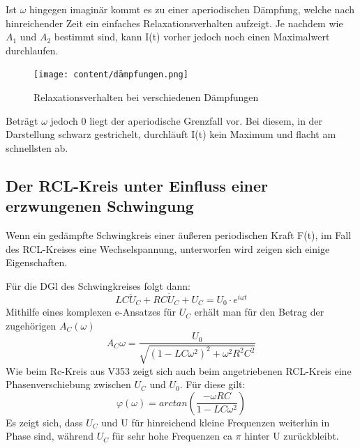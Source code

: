Ist $\omega$ hingegen imaginär kommt es zu einer
aperiodischen Dämpfung, welche nach hinreichender Zeit  ein einfaches Relaxationsverhalten
 aufzeigt. Je nachdem wie $A_1$ und $A_2$ bestimmt sind, kann I(t) vorher jedoch noch einen
 Maximalwert durchlaufen.

 \begin{figure}[H]
   \centering
   \texttt{[image: content/dämpfungen.png]}
   \caption{Relaxationsverhalten bei verschiedenen Dämpfungen}
   \label{fig:Dämpfungen}
 \end{figure}

 Beträgt $\omega$ jedoch 0 liegt der aperiodische Grenzfall vor. Bei diesem, in der Darstellung schwarz gestrichelt,
  durchläuft I(t) kein Maximum und flacht am schnellsten ab.

\subsection{ Der RCL-Kreis unter Einfluss einer erzwungenen Schwingung}

Wenn ein gedämpfte Schwingkreis einer äußeren periodischen Kraft F(t), im Fall des RCL-Kreises
 eine Wechselspannung, unterworfen wird zeigen sich einige Eigenschaften.

Für die DGl des Schwingkreises folgt dann:
\begin{equation}
  LC \ddot{U}_C + RC \dot{U}_C + U_C = U_0 \cdot e^{i\omega t}
\end{equation}
Mithilfe eines komplexen e-Ansatzes für $U_C$ erhält man für den Betrag der zugehörigen $A_C(\omega)$
\begin{equation}
  A_C{\omega} = \frac{U_0}{\sqrt{(1-LC\omega^2)^2 + \omega^2R^2C^2}}
\end{equation}
\begin{equation}
\end{equation}
Wie beim Rc-Kreis aus V353 zeigt sich auch beim angetriebenen RCL-Kreis eine Phasenverschiebung zwischen $U_C$ und $U_0$.
Für diese gilt:
\begin{equation}
  \varphi(\omega) = arctan\left( \frac{-\omega RC}{1-LC \omega^2}\right)
\end{equation}
Es zeigt sich, dass $U_C$ und U für hinreichend kleine Frequenzen weiterhin in Phase sind,
während $U_C$ für sehr hohe Frequenzen ca $\pi$ hinter U zurückbleibt.



